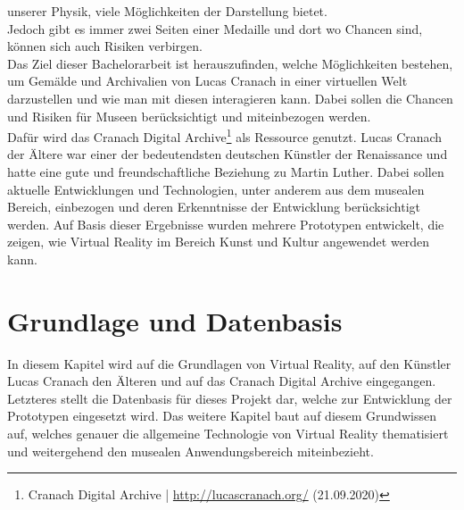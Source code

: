 \documentclass[a4paper,12pt,oneside]{article}
\begin{document}
    unserer Physik, viele Möglichkeiten der Darstellung bietet. \\
    Jedoch gibt es immer zwei Seiten einer Medaille und dort wo Chancen sind, können sich
    auch Risiken verbirgen. \\
    Das Ziel dieser Bachelorarbeit ist herauszufinden, 
    welche Möglichkeiten bestehen, um
    Gemälde und Archivalien von Lucas Cranach in einer virtuellen Welt darzustellen und
    wie man mit diesen interagieren kann. Dabei sollen die Chancen und Risiken für Museen
    berücksichtigt und miteinbezogen werden. \\  
    Dafür wird das Cranach Digital Archive\footnote{Cranach Digital Archive | \url{http://lucascranach.org/} (21.09.2020)}
    als Ressource genutzt. Lucas Cranach der Ältere war einer der bedeutendsten
    deutschen Künstler der Renaissance und hatte eine gute und freundschaftliche
    Beziehung zu Martin Luther. Dabei sollen aktuelle Entwicklungen und Technologien, unter anderem aus dem 
    musealen Bereich, einbezogen und deren Erkenntnisse der Entwicklung berücksichtigt werden.
    Auf Basis dieser Ergebnisse wurden mehrere Prototypen entwickelt,
    die zeigen, wie Virtual Reality im Bereich Kunst und Kultur angewendet werden kann. \\
  \section{Grundlage und Datenbasis}
    In diesem Kapitel wird auf die Grundlagen von Virtual Reality, auf den Künstler Lucas Cranach 
    den Älteren und auf das Cranach Digital Archive eingegangen. Letzteres stellt 
    die Datenbasis für dieses Projekt dar, welche zur Entwicklung der Prototypen 
    eingesetzt wird. 
    Das weitere Kapitel baut auf diesem Grundwissen auf, welches genauer 
    die allgemeine Technologie von Virtual Reality thematisiert und weitergehend
    den musealen Anwendungsbereich miteinbezieht.
\end{document}
